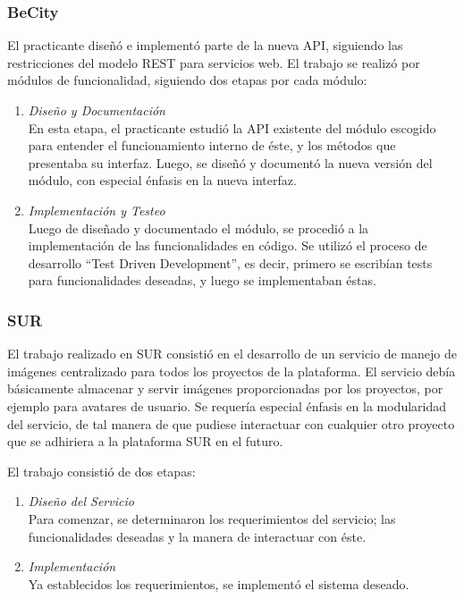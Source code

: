 \documentclass[11pt,letterpaper]{article}
\begin{document}
\subsubsection{BeCity}

El practicante diseñó e implementó parte de la nueva API, siguiendo las restricciones del modelo REST para servicios web. El trabajo se realizó por módulos de funcionalidad, siguiendo dos etapas por cada módulo:
\begin{enumerate}
    \item \emph{Diseño y Documentación} \\ En esta etapa, el practicante estudió la API existente del módulo escogido para entender el funcionamiento interno de éste, y los métodos que presentaba su interfaz. Luego, se diseñó y documentó la nueva versión del módulo, con especial énfasis en la nueva interfaz.
    \item \emph{Implementación y Testeo} \\ Luego de diseñado y documentado el módulo, se procedió a la implementación de las funcionalidades en código. Se utilizó el proceso de desarrollo ``Test Driven Development'', es decir, primero se escribían tests para funcionalidades deseadas, y luego se implementaban éstas.
\end{enumerate}

\subsubsection{SUR}

El trabajo realizado en SUR consistió en el desarrollo de un servicio de manejo de imágenes centralizado para todos los proyectos de la plataforma. El servicio debía básicamente almacenar y servir imágenes proporcionadas por los proyectos, por ejemplo para avatares de usuario. Se requería especial énfasis en la modularidad del servicio, de tal manera de que pudiese interactuar con cualquier otro proyecto que se adhiriera a la plataforma SUR en el futuro.

El trabajo consistió de dos etapas:
\begin{enumerate}
    \item \emph{Diseño del Servicio}\\ Para comenzar, se determinaron los requerimientos del servicio; las funcionalidades deseadas y la manera de interactuar con éste.
    \item \emph{Implementación}\\ Ya establecidos los requerimientos, se implementó el sistema deseado.
\end{enumerate}
\end{document}
